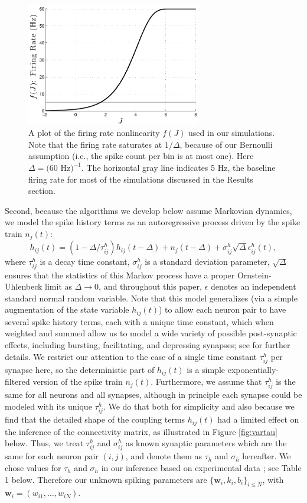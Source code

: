 \documentclass[aoas,preprint]{imsart}
\newcommand{\w}{w}
\newcommand{\bw}{\mathbf{\w}}
\begin{document}
\begin{figure}[t!]
\centering \includegraphics[width=3in]{../figs/fr_vs_J}
\caption{A plot of the firing rate nonlinearity $f(J)$ used in our
  simulations.  Note that the firing
  rate saturates at $1/\Delta$, because of our Bernoulli assumption
  (i.e., the spike count per bin is at most one). Here $\Delta = (60$
  Hz$)^{-1}$.  The horizontal gray line indicates 5 Hz, the baseline
  firing rate for most of the simulations discussed in the Results section.}
\label{fig:egfluor}
\end{figure}

Second, because the algorithms we develop below assume Markovian
dynamics, we model the spike history terms as an autoregressive
process driven by the spike train $n_j(t)$:
\begin{equation} \label{eqn:h:definition}
h_{ij}(t) = (1- \Delta/\tau^h_{ij}) h_{ij}(t- \Delta) +n_j(t-\Delta) +
  \sigma^h_{ij} \sqrt{\Delta} \epsilon^h_{ij}(t),
\end{equation}
where $\tau^h_{ij}$ is a decay time constant, $\sigma^h_{ij}$ is a
standard deviation parameter, $\sqrt{\Delta}$ ensures that the
statistics of this Markov process have a proper Ornstein-Uhlenbeck
limit as $\Delta \to 0$, and throughout this paper, $\epsilon$ denotes
an independent standard normal random variable. Note that this model
generalizes (via a simple augmentation of the state variable
$h_{ij}(t)$) to allow each neuron pair to have several spike history
terms, each with a unique time constant, which when weighted and
summed allow us to model a wide variety of possible post-synaptic
effects, including bursting, facilitating, and depressing synapses;
see \cite{Vogelstein2009} for further details. We restrict our
attention to the case of a single time constant $\tau^h_{ij}$ per
synapse here, so the deterministic part of $h_{ij}(t)$ is a simple
exponentially-filtered version of the spike train
$n_j(t)$. Furthermore, we assume that $\tau^h_{ij}$ is the same for
all neurons and all synapses, although in principle each synapse could
be modeled with its unique $\tau^h_{ij}$. We do that both for
simplicity and also because we find that the detailed shape of the
coupling terms $h_{ij}(t)$ had a limited effect on the inference of
the connectivity matrix, as illustrated in Figure \ref{fig:vartau}
below. Thus, we treat $\tau^h_{ij}$ and $\sigma^h_{ij}$ as known
synaptic parameters which are the same for each neuron pair $(i,j)$,
and denote them as $\tau_h$ and $\sigma_h$ hereafter.  We chose values
for $\tau_h$ and $\sigma_h$ in our inference based on experimental
data \cite{Lefort2009}; see Table 1 below. Therefore our unknown
spiking parameters are $\{\bw_i,k_i,b_i\}_{i\leq N}$, with
$\bw_i=(\w_{i1},\ldots, \w_{iN})$.
\end{document}
